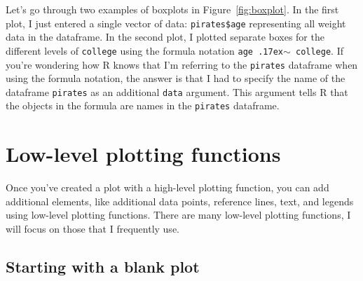 \documentclass{tufte-book}\usepackage[]{graphicx}\usepackage[]{color}
\begin{document}
Let's go through two examples of boxplots in Figure~\ref{fig:boxplot}. In the first plot, I just entered a single vector of data: \texttt{pirates\$age} representing all weight data in the dataframe. In the second plot, I plotted separate boxes for the different levels of \texttt{college} using the formula notation \texttt{age {\raise.17ex\hbox{$\scriptstyle\sim$}} college}. If you're wondering how R knows that I'm referring to the \texttt{pirates} dataframe when using the formula notation, the answer is that I had to specify the name of the dataframe \texttt{pirates} as an additional \texttt{data} argument. This argument tells R that the objects in the formula are names in the \texttt{pirates} dataframe.



\section{Low-level plotting functions}

Once you've created a plot with a high-level plotting function, you can add additional elements, like additional data points, reference lines, text, and legends using low-level plotting functions. There are many low-level plotting functions, I will focus on those that I frequently use.

\subsection{Starting with a blank plot}
\end{document}
